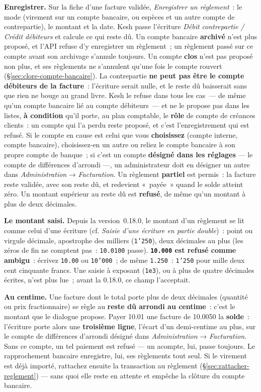 \documentclass[a4paper,11pt,oneside]{article}
\begin{document}
\textbf{Enregistrer.} Sur la fiche d'une facture validée, \emph{Enregistrer un règlement}~: le
mode (virement sur un compte bancaire, ou espèces et un autre compte de contrepartie), le montant
et la date. Kesh passe l'écriture \emph{Débit contrepartie / Crédit débiteurs} et calcule ce qui
reste dû. Un compte bancaire \textbf{archivé} n'est plus proposé, et l'API refuse d'y enregistrer
un règlement~; un règlement passé sur ce compte avant son archivage s'annule toujours. Un compte
\textbf{clos} n'est pas proposé non plus, et ses règlements ne s'annulent qu'une fois le compte
rouvert (\S\ref{sec:clore-compte-bancaire}). La contrepartie \textbf{ne peut pas être le compte débiteurs de la facture}~: l'écriture
serait nulle, et le reste dû baisserait sans que rien ne bouge au grand livre. Kesh le refuse dans
tous les cas~--- de même qu'un compte bancaire lié au compte débiteurs~--- et ne le propose pas dans
les listes, \textbf{à condition} qu'il porte, au plan comptable, le \textbf{rôle} de compte de
créances clients~: un compte qui l'a perdu reste proposé, et c'est l'enregistrement qui est
refusé. Si le compte en cause
est celui que vous \textbf{choisissez} (compte interne, compte bancaire), choisissez-en un autre
ou reliez le compte bancaire à son propre compte de banque~; si c'est un compte \textbf{désigné
dans les réglages} --- le compte de différences d'arrondi ---, un administrateur doit en désigner
un autre dans \emph{Administration} → \emph{Facturation}.
Un règlement \textbf{partiel} est permis~: la facture reste validée, avec son reste dû, et
redevient «~payée~» quand le solde atteint zéro. Un montant supérieur au reste dû est
\textbf{refusé}, de même qu'un montant à plus de deux décimales.

\textbf{Le montant saisi.} Depuis la version~0.18.0, le montant d'un règlement se lit comme
celui d'une écriture (cf. \emph{Saisie d'une écriture en partie double})~: point ou virgule
décimale, apostrophe des milliers (\texttt{1'250}), deux décimales au plus (les zéros de fin ne
comptent pas~: \texttt{10.0100} passe). \textbf{\texttt{10.000} est refusé comme ambigu}~:
écrivez \texttt{10.00} ou \texttt{10'000}~; de même \texttt{1.250}~: \texttt{1'250} pour mille
deux cent cinquante francs. Une saisie à exposant (\texttt{1e3}), ou à plus de quatre décimales
écrites, n'est plus lue~; avant la 0.18.0, ce champ l'acceptait.

\textbf{Au centime.} Une facture dont le total porte plus de deux décimales (quantité ou prix
fractionnaire) se règle au \textbf{reste dû arrondi au centime}~: c'est le montant que le
dialogue propose. Payer 10.01 une facture de 10.0050 la \textbf{solde}~: l'écriture porte alors
une \textbf{troisième ligne}, l'écart d'un demi-centime au plus, sur le compte de différences
d'arrondi désigné dans \emph{Administration} → \emph{Facturation}. Sans ce compte, un tel paiement est
refusé --- un acompte, lui, passe toujours. Le rapprochement bancaire enregistre, lui, ses règlements tout seul. Si le virement est déjà importé, rattachez ensuite la transaction au règlement (\S\ref{sec:rattacher-reglement}) --- sans quoi elle reste en attente et empêche la clôture du compte bancaire.
\end{document}
